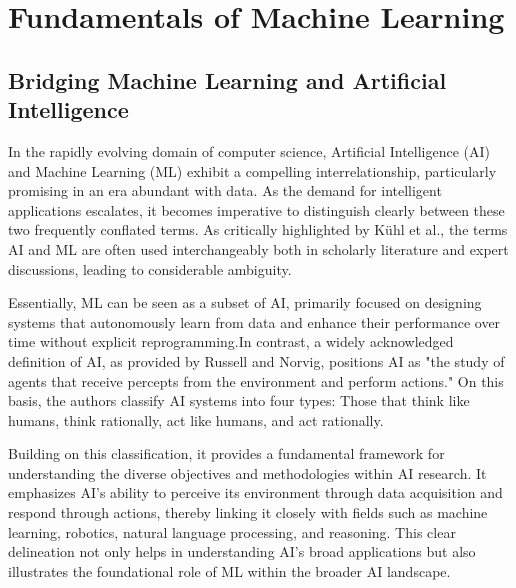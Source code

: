 \section{Fundamentals of Machine Learning}
\subsection{Bridging Machine Learning and Artificial Intelligence}
In the rapidly evolving domain of computer science, Artificial Intelligence (AI) and Machine Learning (ML) exhibit a compelling interrelationship,
particularly promising in an era abundant with data. As the demand for intelligent applications escalates, it becomes imperative to distinguish
clearly between these two frequently conflated terms. As critically highlighted by Kühl et al.\cite{ai_and_ml_2020}, the terms AI and ML are often
used interchangeably both in scholarly literature and expert discussions, leading to considerable ambiguity.

Essentially, ML can be seen as a subset of AI, primarily focused on designing systems that autonomously learn from data and enhance their
performance over time without explicit reprogramming.In contrast, a widely acknowledged definition of AI, as provided by Russell and
Norvig\cite{russell_norvig_book}, positions AI as "the study of agents that receive percepts from the environment and perform actions."
On this basis, the authors classify AI systems into four types: Those that think like humans, think rationally, act like humans, and act
rationally.

Building on this classification, it provides a fundamental framework for understanding the diverse objectives and methodologies within AI research.
It emphasizes AI’s ability to perceive its environment through data acquisition and respond through actions, thereby linking it closely with fields
such as machine learning, robotics, natural language processing, and reasoning. This clear delineation not only helps in understanding AI's broad
applications but also illustrates the foundational role of ML within the broader AI landscape.

